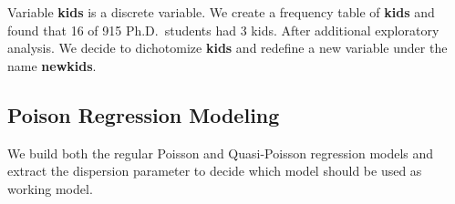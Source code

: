 \documentclass[
]{book}
\newenvironment{Shaded}{\begin{snugshade}}{\end{snugshade}}
\newcommand{\AttributeTok}[1]{\textcolor[rgb]{0.13,0.29,0.53}{#1}}
\newcommand{\CommentTok}[1]{\textcolor[rgb]{0.56,0.35,0.01}{\textit{#1}}}
\newcommand{\ConstantTok}[1]{\textcolor[rgb]{0.56,0.35,0.01}{#1}}
\newcommand{\DecValTok}[1]{\textcolor[rgb]{0.00,0.00,0.81}{#1}}
\newcommand{\FloatTok}[1]{\textcolor[rgb]{0.00,0.00,0.81}{#1}}
\newcommand{\FunctionTok}[1]{\textcolor[rgb]{0.13,0.29,0.53}{\textbf{#1}}}
\newcommand{\NormalTok}[1]{#1}
\newcommand{\OtherTok}[1]{\textcolor[rgb]{0.56,0.35,0.01}{#1}}
\newcommand{\SpecialCharTok}[1]{\textcolor[rgb]{0.81,0.36,0.00}{\textbf{#1}}}
\newcommand{\StringTok}[1]{\textcolor[rgb]{0.31,0.60,0.02}{#1}}
\begin{document}
Variable \textbf{kids} is a discrete variable. We create a frequency table of \textbf{kids} and found that 16 of 915 Ph.D.~students had 3 kids. After additional exploratory analysis. We decide to dichotomize \textbf{kids} and redefine a new variable under the name \textbf{newkids}.

\begin{Shaded}
\end{Shaded}

\hypertarget{poison-regression-modeling-1}{%
\subsection{Poison Regression Modeling}\label{poison-regression-modeling-1}}

We build both the regular Poisson and Quasi-Poisson regression models and extract the dispersion parameter to decide which model should be used as working model.

\hypertarget{section}{%
\section{}\label{section}}
\end{document}
